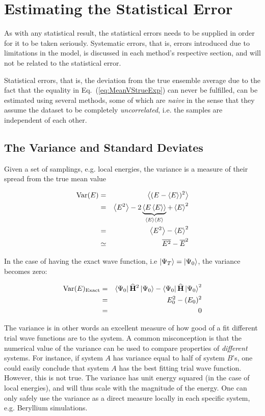 \section{Estimating the Statistical Error}

As with any statistical result, the statistical errors needs to be supplied in order for it to be taken seriously. Systematic errors, that is, errors introduced due to limitations in the model, is discussed in each method's respective section, and will not be related to the statistical error. 

Statistical errors, that is, the  deviation from the true ensemble average due to the fact that the equality in Eq.~(\ref{eq:MeanVStrueExp}) can never be fulfilled, can be estimated using several methods, some of which are \textit{naive} in the sense that they assume the dataset to be completely \textit{uncorrelated}, i.e. the samples are independent of each other.

\subsection{The Variance and Standard Deviates}
\label{sec:varAndSTD}

Given a set of samplings, e.g. local energies, the variance is a measure of their spread from the true mean value

\begin{eqnarray}
\label{eq:variance}
\mathrm{Var}(E) &=& \left< (E-\left< E \right>)^2 \right> \nonumber\\
        &=& \left< E^2 \right> - 2\underbrace{\left< E\left< E \right> \right>}_{\left< E \right>\left< E \right>} + \left< E \right>^2 \nonumber\\
        &=& \left< E^2 \right> - \left< E \right>^2 \\
        &\simeq& \overline{E^2} - \overline{E}^2
\end{eqnarray}

In the case of having the exact wave function, i.e $\left| \Psi_T \right> = \left| \Psi_0 \right>$, the variance becomes zero:

\begin{eqnarray*}
\label{eq:varianceZeroExact}
\mathrm{Var}(E)_\mathrm{Exact} &=& \left< \Psi_0 \right|{\bf\widehat{H}}^2\left| \Psi_0 \right> -  \left< \Psi_0 \right|{\bf\widehat{H}}\left| \Psi_0 \right>^2 \\
		        &=& E_0^2 - (E_0)^2 \\
		        &=& 0
\end{eqnarray*}

The variance is in other words an excellent measure of how good of a fit different trial wave functions are to the system. A common misconception is that the numerical value of the variance can be used to compare properties of \textit{different} systems. For instance, if system $A$ has variance equal to half of system $B$'s, one could easily conclude that system $A$ has the best fitting trial wave function. However, this is not true. The variance has unit energy squared (in the case of local energies), and will thus scale with the magnitude of the energy. One can only safely use the variance as a direct measure locally in each specific system, e.g. Beryllium simulations.

